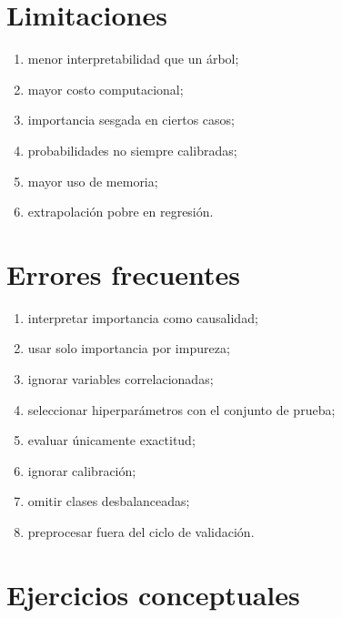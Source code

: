 \documentclass[
  spanish,
  10.5pt,
  letterpaper,
  DIV=11,
  numbers=noendperiod,
  oneside,
  open=any]{scrreprt}
\providecommand{\tightlist}{%
  \setlength{\itemsep}{0pt}\setlength{\parskip}{0pt}}
\theoremstyle{definition}
\theoremstyle{definition}
\theoremstyle{plain}
\theoremstyle{remark}
\begin{document}
\section*{Limitaciones}\label{limitaciones-2}


\begin{enumerate}
\def\labelenumi{\arabic{enumi}.}
\tightlist
\item
  menor interpretabilidad que un árbol;
\item
  mayor costo computacional;
\item
  importancia sesgada en ciertos casos;
\item
  probabilidades no siempre calibradas;
\item
  mayor uso de memoria;
\item
  extrapolación pobre en regresión.
\end{enumerate}

\section*{Errores frecuentes}\label{errores-frecuentes-12}


\begin{enumerate}
\def\labelenumi{\arabic{enumi}.}
\tightlist
\item
  interpretar importancia como causalidad;
\item
  usar solo importancia por impureza;
\item
  ignorar variables correlacionadas;
\item
  seleccionar hiperparámetros con el conjunto de prueba;
\item
  evaluar únicamente exactitud;
\item
  ignorar calibración;
\item
  omitir clases desbalanceadas;
\item
  preprocesar fuera del ciclo de validación.
\end{enumerate}

\section*{Ejercicios conceptuales}\label{ejercicios-conceptuales-12}
\end{document}
